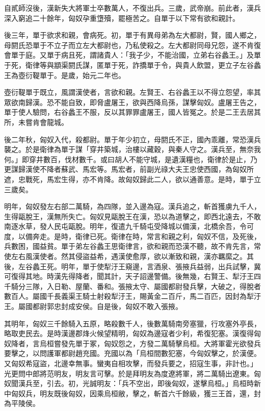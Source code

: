 \begin{pinyinscope}
自貳師沒後，漢新失大將軍士卒數萬人，不復出兵。三歲，武帝崩。前此者，漢兵深入窮追二十餘年，匈奴孕重墯殰，罷極苦之。自單于以下常有欲和親計。

後三年，單于欲求和親，會病死。初，單于有異母弟為左大都尉，賢，國人鄉之，母閼氏恐單于不立子而立左大都尉也，乃私使殺之。左大都尉同母兄怨，遂不肯復會單于庭。又單于病且死，謂諸貴人：「我子少，不能治國，立弟右谷蠡王。」及單于死，衛律等與顓渠閼氏謀，匿單于死，詐撟單于令，與貴人飲盟，更立子左谷蠡王為壺衍鞮單于。是歲，始元二年也。

壺衍鞮單于既立，風謂漢使者，言欲和親。左賢王、右谷蠡王以不得立怨望，率其眾欲南歸漢。恐不能自致，即脅盧屠王，欲與西降烏孫，謀擊匈奴。盧屠王告之，單于使人驗問，右谷蠡王不服，反以其罪罪盧屠王，國人皆冤之。於是二王去居其所，未嘗肯會龍城。

後二年秋，匈奴入代，殺都尉。單于年少初立，母閼氏不正，國內乖離，常恐漢兵襲之。於是衛律為單于謀「穿井築城，治樓以藏穀，與秦人守之。漢兵至，無奈我何。」即穿井數百，伐材數千。或曰胡人不能守城，是遺漢糧也，衛律於是止，乃更謀歸漢使不降者蘇武、馬宏等。馬宏者，前副光祿大夫王忠使西國，為匈奴所遮，忠戰死，馬宏生得，亦不肯降。故匈奴歸此二人，欲以通善意。是時，單于立三歲矣。

明年，匈奴發左右部二萬騎，為四隊，並入邊為寇。漢兵追之，斬首獲虜九千人，生得甌脫王，漢無所失亡。匈奴見甌脫王在漢，恐以為道擊之，即西北遠去，不敢南逐水草，發人民屯甌脫。明年，復遣九千騎屯受降城以備漢，北橋余吾，令可度，以備奔走。是時，衛律已死。衛律在時，常言和親之利，匈奴不信，及死後，兵數困，國益貧。單于弟左谷蠡王思衛律言，欲和親而恐漢不聽，故不肯先言，常使左右風漢使者。然其侵盜益希，遇漢使愈厚，欲以漸致和親，漢亦羈縻之。其後，左谷蠡王死。明年，單于使犁汙王窺邊，言酒泉、張掖兵益弱，出兵試擊，冀可復得其地。時漢先得降者，聞其計，天子詔邊警備。後無幾，右賢王、犁汙王四千騎分三隊，入日勒、屋蘭、番和。張掖太守、屬國都尉發兵擊，大破之，得脫者數百人。屬國千長義渠王騎士射殺犁汙王，賜黃金二百斤，馬二百匹，因封為犁汙王。屬國都尉郭忠封成安侯。自是後，匈奴不敢入張掖。

其明年，匈奴三千餘騎入五原，略殺數千人，後數萬騎南旁塞獵，行攻塞外亭長，略取吏民去。是時漢邊郡烽火候望精明，匈奴為邊寇者少利，希復犯塞。漢復得匈奴降者，言烏桓嘗發先單于冢，匈奴怨之，方發二萬騎擊烏桓。大將軍霍光欲發兵要擊之，以問護軍都尉趙充國。充國以為「烏桓間數犯塞，今匈奴擊之，於漢便。又匈奴希寇盜，北邊幸無事。蠻夷自相攻擊，而發兵要之，招寇生事，非計也。」光更問中郎將范明友，明友言可擊。於是拜明友為度遼將軍，將二萬騎出遼東。匈奴聞漢兵至，引去。初，光誠明友：「兵不空出，即後匈奴，遂擊烏桓。」烏桓時新中匈奴兵，明友既後匈奴，因乘烏桓敝，擊之，斬首六千餘級，獲三王首，還，封為平陵侯。


\end{pinyinscope}
